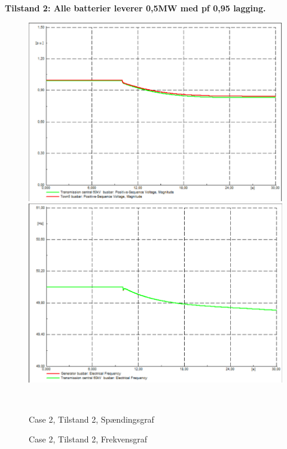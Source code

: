 \textbf{Tilstand 2: Alle batterier leverer 0,5MW med pf 0,95 lagging.}
\begin{figure}[H]
	\centering
	\begin{minipage}[b]{0.48\textwidth}
		\centering
		\includegraphics[width=1.00\textwidth]{figurer/LargeDisturbance/Voltage2} %
	\end{minipage}
	\hfill
	\begin{minipage}[b]{0.48\textwidth}
		\centering
		\includegraphics[width=1.00\textwidth]{figurer/LargeDisturbance/Freq2} %
	\end{minipage}
	\\ %
	\begin{minipage}[t]{0.48\textwidth}
		\caption{Case 2, Tilstand 2, Spændingsgraf} %
		\label{fig:C2T2V}
	\end{minipage}
	\hfill
	\begin{minipage}[t]{0.48\textwidth}
		\caption{Case 2, Tilstand 2, Frekvensgraf} %
		\label{fig:C2T2F}
	\end{minipage}
\end{figure}

